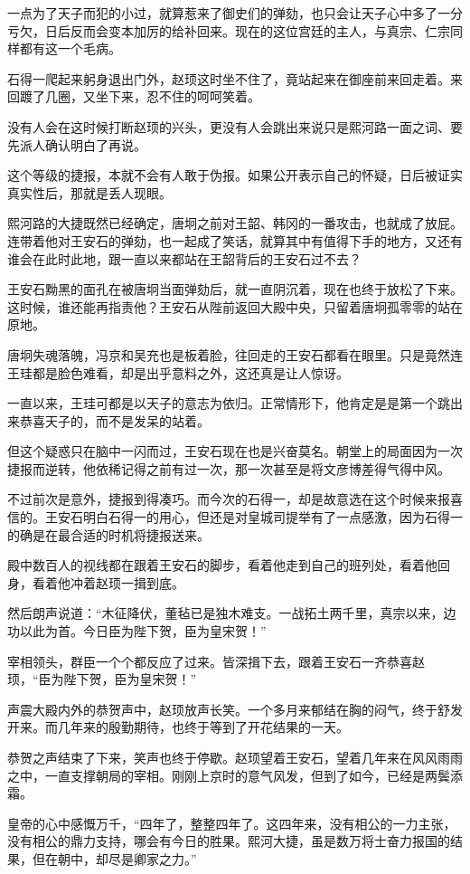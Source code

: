 一点为了天子而犯的小过，就算惹来了御史们的弹劾，也只会让天子心中多了一分亏欠，日后反而会变本加厉的给补回来。现在的这位宫廷的主人，与真宗、仁宗同样都有这一个毛病。

石得一爬起来躬身退出门外，赵顼这时坐不住了，竟站起来在御座前来回走着。来回踱了几圈，又坐下来，忍不住的呵呵笑着。

没有人会在这时候打断赵顼的兴头，更没有人会跳出来说只是熙河路一面之词、要先派人确认明白了再说。

这个等级的捷报，本就不会有人敢于伪报。如果公开表示自己的怀疑，日后被证实真实性后，那就是丢人现眼。

熙河路的大捷既然已经确定，唐坰之前对王韶、韩冈的一番攻击，也就成了放屁。连带着他对王安石的弹劾，也一起成了笑话，就算其中有值得下手的地方，又还有谁会在此时此地，跟一直以来都站在王韶背后的王安石过不去？

王安石黝黑的面孔在被唐坰当面弹劾后，就一直阴沉着，现在也终于放松了下来。这时候，谁还能再指责他？王安石从陛前返回大殿中央，只留着唐坰孤零零的站在原地。

唐坰失魂落魄，冯京和吴充也是板着脸，往回走的王安石都看在眼里。只是竟然连王珪都是脸色难看，却是出乎意料之外，这还真是让人惊讶。

一直以来，王珪可都是以天子的意志为依归。正常情形下，他肯定是是第一个跳出来恭喜天子的，而不是发呆的站着。

但这个疑惑只在脑中一闪而过，王安石现在也是兴奋莫名。朝堂上的局面因为一次捷报而逆转，他依稀记得之前有过一次，那一次甚至是将文彦博差得气得中风。

不过前次是意外，捷报到得凑巧。而今次的石得一，却是故意选在这个时候来报喜信的。王安石明白石得一的用心，但还是对皇城司提举有了一点感激，因为石得一的确是在最合适的时机将捷报送来。

殿中数百人的视线都在跟着王安石的脚步，看着他走到自己的班列处，看着他回身，看着他冲着赵顼一揖到底。

然后朗声说道：“木征降伏，董毡已是独木难支。一战拓土两千里，真宗以来，边功以此为首。今日臣为陛下贺，臣为皇宋贺！”

宰相领头，群臣一个个都反应了过来。皆深揖下去，跟着王安石一齐恭喜赵顼，“臣为陛下贺，臣为皇宋贺！”

声震大殿内外的恭贺声中，赵顼放声长笑。一个多月来郁结在胸的闷气，终于舒发开来。而几年来的殷勤期待，也终于等到了开花结果的一天。

恭贺之声结束了下来，笑声也终于停歇。赵顼望着王安石，望着几年来在风风雨雨之中，一直支撑朝局的宰相。刚刚上京时的意气风发，但到了如今，已经是两鬓添霜。

皇帝的心中感慨万千，“四年了，整整四年了。这四年来，没有相公的一力主张，没有相公的鼎力支持，哪会有今日的胜果。熙河大捷，虽是数万将士奋力报国的结果，但在朝中，却尽是卿家之力。”

